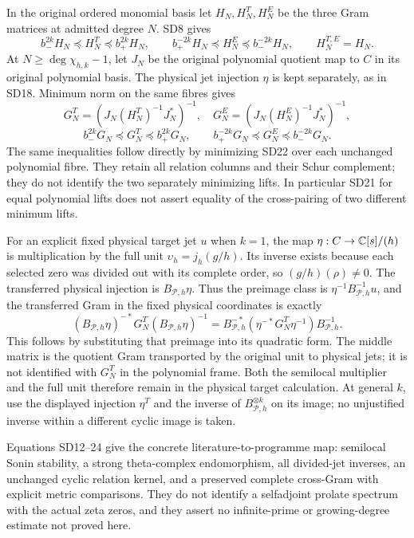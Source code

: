 \documentclass[11pt]{article}
\begin{document}
In the original ordered monomial basis let $H_N,H_N^T,H_N^E$
be the three Gram matrices at admitted degree $N$. SD8 gives
\[
 b_-^{2k}H_N\preceq H_N^T\preceq b_+^{2k}H_N,\qquad
 b_+^{-2k}H_N\preceq H_N^E\preceq b_-^{-2k}H_N,\qquad
 H_N^{T,E}=H_N.                                               \tag{SD22}
\]
At $N\ge\deg\chi_{h,k}-1$, let $J_N$ be the original polynomial
quotient map to $C$ in its original polynomial basis. The physical
jet injection $\eta$ is kept separately, as in SD18. Minimum norm on the same
fibres gives
\[
 G_N^T=(J_N(H_N^T)^{-1}J_N^*)^{-1},\quad
 G_N^E=(J_N(H_N^E)^{-1}J_N^*)^{-1},
\]
\[
 b_-^{2k}G_N\preceq G_N^T\preceq b_+^{2k}G_N,\qquad
 b_+^{-2k}G_N\preceq G_N^E\preceq b_-^{-2k}G_N.                \tag{SD23}
\]
The same inequalities follow directly by minimizing SD22 over
each unchanged polynomial fibre. They retain all relation columns
and their Schur complement; they do not identify the two separately
minimizing lifts. In particular SD21 for equal polynomial lifts
does not assert equality of the cross-pairing of two different
minimum lifts.

For an explicit fixed physical target jet $u$ when $k=1$, the
map $\eta:C\to\mathbb C[s]/(h)$ is multiplication by the full unit
$\upsilon_h=j_h(g/h)$. Its inverse exists because each selected
zero was divided out with its complete order, so
$(g/h)(\rho)\ne0$. The transferred physical injection is $B_{\mathcal
P,h}\eta$. Thus the preimage class is
$\eta^{-1}B_{\mathcal P,h}^{-1}u$, and the transferred Gram in
the fixed physical coordinates is exactly
\[
 (B_{\mathcal P,h}\eta)^{-*}G_N^T
              (B_{\mathcal P,h}\eta)^{-1}
 =B_{\mathcal P,h}^{-*}
       (\eta^{-*}G_N^T\eta^{-1})B_{\mathcal P,h}^{-1}.
                                                               \tag{SD24}
\]
This follows by substituting that preimage into its quadratic form.
The middle matrix is the quotient Gram transported by the original
unit to physical jets; it is not identified with $G_N^T$ in the
polynomial frame. Both the semilocal multiplier and the full unit
therefore remain in the physical target calculation.
At general $k$, use the displayed injection $\eta^T$ and the inverse
of $B_{\mathcal P,h}^{\otimes k}$ on its image; no unjustified
inverse within a different cyclic image is taken.

Equations SD12--24 give the concrete literature-to-programme map:
semilocal Sonin stability, a strong theta-complex endomorphism,
all divided-jet inverses, an unchanged cyclic relation kernel,
and a preserved complete cross-Gram with explicit metric comparisons.
They do not identify a selfadjoint prolate spectrum with the actual
zeta zeros, and they assert no infinite-prime or growing-degree
estimate not proved here.
\end{document}
